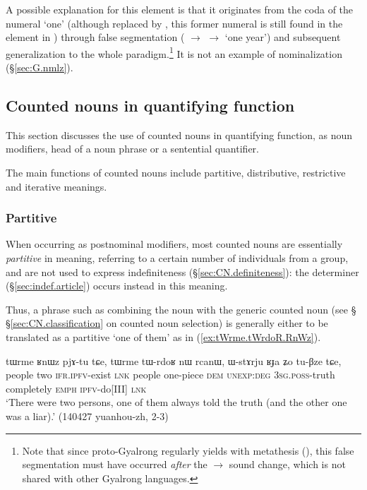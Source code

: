 A possible explanation for this  element is that it originates from the coda of the numeral `one' (although replaced by , this former numeral is still found in the element  in ) through false segmentation ( $\rightarrow$  $\rightarrow$  `one year') and subsequent generalization to the whole paradigm.\footnote{Note that since proto-Gyalrong  regularly yields  with metathesis (\citealt[272]{jacques04these}), this false segmentation must have occurred \textit{after} the  $\rightarrow$ sound change, which is not shared with other Gyalrong languages. } It is not an example of  nominalization (§\ref{sec:G.nmlz}).


\subsection{Counted nouns in quantifying function} \label{sec:CN.quantifier}
This section discusses the use of counted nouns in  quantifying function, as noun modifiers, head of a noun phrase or a sentential quantifier.

The main functions of counted nouns include partitive, distributive, restrictive and iterative meanings.

\subsubsection{Partitive} \label{sec:CN.partitive}
When occurring as postnominal modifiers, most counted nouns are essentially \textit{partitive} in meaning, referring to a certain number of individuals from a group, and are not used to express indefiniteness (§\ref{sec:CN.definiteness}): the determiner   (§\ref{sec:indef.article}) occurs instead in this meaning.

Thus, a phrase such as   combining the noun  with the generic counted noun  (see § §\ref{sec:CN.classification} on counted noun selection) is generally either to be translated as a partitive `one of them'  as in (\ref{ex:tWrme.tWrdoR.RnWz}).

\begin{exe}
	\ex \label{ex:tWrme.tWrdoR.RnWz}
	\gll tɯrme ʁnɯz pjɤ-tu tɕe, tɯrme tɯ-rdoʁ nɯ rcanɯ, ɯ-stɤrju ʁɟa ʑo tu-βze tɕe, \\
	people two \textsc{ifr}.\textsc{ipfv}-exist \textsc{lnk} people one-piece \textsc{dem} \textsc{unexp}:\textsc{deg} \textsc{3sg}.\textsc{poss}-truth completely \textsc{emph} \textsc{ipfv}-do[III] \textsc{lnk} \\
	\glt `There were two persons, one of them always told the truth (and the other one was a liar).' (140427 yuanhou-zh, 2-3)
\end{exe} 

